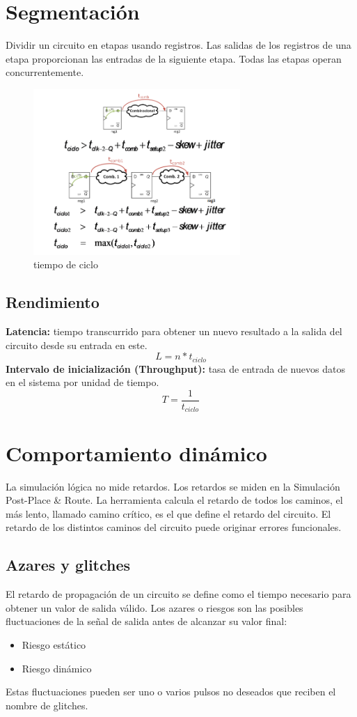 \section{Segmentación}
Dividir un circuito en etapas usando registros. Las salidas de los registros de una etapa proporcionan las entradas de la siguiente etapa. Todas las etapas operan concurrentemente.
\begin{figure}[H]
    \centering
    \includegraphics[width=0.7\textwidth]{images/Tema_2/segmentacion2.PNG}
    \caption{tiempo de ciclo}
\end{figure}

\subsection{Rendimiento}
\textbf{Latencia:} tiempo transcurrido para obtener un nuevo resultado a la salida del circuito desde su entrada en este.
\[
    L = n*t_{ciclo}
\]
\textbf{Intervalo de inicialización (Throughput):} tasa de entrada de nuevos datos en el sistema por unidad de tiempo.
\[
    T = \frac{1}{t_{ciclo}}
\]

\section{Comportamiento dinámico}
La simulación lógica no mide retardos. Los retardos se miden en la Simulación Post-Place \& Route. La herramienta calcula el retardo de todos los caminos, el más lento, llamado camino crítico, es el que define el retardo del circuito. El retardo de los distintos caminos del circuito puede originar errores funcionales.

\subsection{Azares y glitches}
El retardo de propagación de un circuito se define como el tiempo necesario para obtener un valor de salida válido. Los azares o riesgos son las posibles fluctuaciones de la señal de salida antes de alcanzar su valor final:
\begin{itemize}
    \item Riesgo estático
    \item Riesgo dinámico
\end{itemize}
Estas fluctuaciones pueden ser uno o varios pulsos no deseados que reciben el nombre de glitches.

